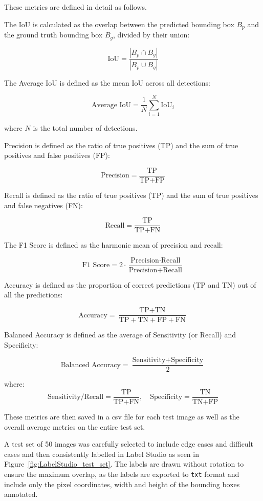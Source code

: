 These metrics are defined in detail as follows.

The IoU is calculated as the overlap between the predicted bounding box \( B_p \) and the ground truth bounding box \( B_g \), divided by their union:

\[
  \text{IoU} = \frac{|B_p \cap B_g|}{|B_p \cup B_g|}
\]

The Average IoU is defined as the mean IoU across all detections:

\[
  \text{Average IoU} = \frac{1}{N} \sum_{i=1}^{N} \text{IoU}_i
\]

where \( N \) is the total number of detections.

Precision is defined as the ratio of true positives (TP) and the sum of true positives and false positives (FP):

\[
  \text{Precision} = \frac{\text{TP}}{\text{TP} + \text{FP}}
\]

Recall is defined as the ratio of true positives (TP) and the sum of true positives and false negatives (FN):

\[
  \text{Recall} = \frac{\text{TP}}{\text{TP} + \text{FN}}
\]

The F1 Score is defined as the harmonic mean of precision and recall:

\[
  \text{F1 Score} = 2 \cdot \frac{\text{Precision} \cdot \text{Recall}}{\text{Precision} + \text{Recall}}
\]

Accuracy is defined as the proportion of correct predictions (TP and TN) out of all the predictions:

\[
  \text{Accuracy} = \frac{\text{TP} + \text{TN}}{\text{TP} + \text{TN} + \text{FP} + \text{FN}}
\]

Balanced Accuracy is defined as the average of Sensitivity (or Recall) and Specificity:

\[
  \text{Balanced Accuracy} = \frac{\text{Sensitivity} + \text{Specificity}}{2}
\]

where:
\[
  \text{Sensitivity/Recall} = \frac{\text{TP}}{\text{TP} + \text{FN}}, \quad
  \text{Specificity} = \frac{\text{TN}}{\text{TN} + \text{FP}}
\]

These metrics are then saved in a csv file for each test image as well as the overall average metrics on the entire test set.

A test set of 50 images was carefully selected to include edge cases and difficult cases and then consistently labelled in Label Studio as seen in Figure~\ref{fig:LabelStudio_test_set}. The labels are drawn without rotation to ensure the maximum overlap, as the labels are exported to \texttt{txt} format and include only the pixel coordinates, width and  height of the bounding boxes annotated.

